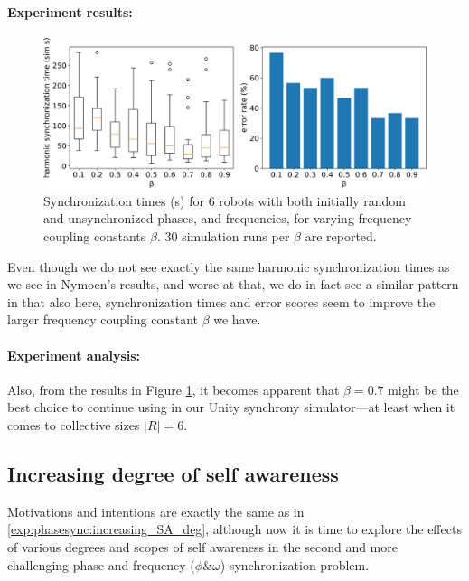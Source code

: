 		\paragraph{Experiment results:\nl}
		
		\begin{figure}[ht!]
			\centering
			\includegraphics[width=\linewidth]{Assets/DocSegments/Chapters/ExperimentsAndResults/Figures/PerfScores/baseline_reproducing_phase_and_freq_sync_for_beta.pdf}
			\caption{Synchronization times (s) for 6 robots with both initially random and unsynchronized phases, and frequencies, for varying frequency coupling constants $\beta$. 30 simulation runs per $\beta$ are reported.}
			\label{fig:baseline_reproducing_phase_and_freq_sync_for_beta}
		\end{figure}
		
		Even though we do not see exactly the same harmonic synchronization times as we see in Nymoen's results, and worse at that, we do in fact see a similar pattern in that also here, synchronization times and error scores seem to improve the larger frequency coupling constant $\beta$ we have.
		
		\paragraph{Experiment analysis:\nl}
		
		Also, from the results in Figure \ref{fig:baseline_reproducing_phase_and_freq_sync_for_beta}, it becomes apparent that $\beta=0.7$ might be the best choice to continue using in our Unity synchrony simulator—at least when it comes to collective sizes $|R|=6$.
		
	
	\subsection{Increasing degree of self awareness}
	\label{exp:phase_and_freq_sync:increasing_SA_deg}
	
	Motivations and intentions are exactly the same as in \ref{exp:phasesync:increasing_SA_deg}, although now it is time to explore the effects of various degrees and scopes of self awareness in the second and more challenging phase and frequency ($\phi \& \omega$) synchronization problem.
	

